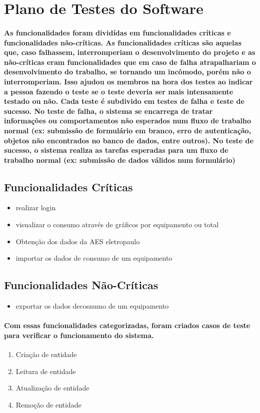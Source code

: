 \section{Plano de Testes do Software}
\label{Sec:6-software}
\paragraph{%
As funcionalidades foram dividídas em funcionalidades críticas e funcionalidades não-críticas. As funcionalidades críticas são aquelas que, caso falhassem, interromperiam o desenvolvimento do projeto e as não-críticas eram funcionalidades que em caso de falha atrapalhariam o desenvolvimento do trabalho, se tornando um incômodo, porém não o interromperiam. Isso ajudou os membros na hora dos testes ao indicar a pessoa fazendo o teste se o teste deveria ser mais intensamente testado ou não. Cada teste é subdivido em testes de falha e teste de sucesso. No teste de falha, o sistema se encarrega de tratar informações ou comportamentos não esperados num fluxo de trabalho normal (ex: submissão de formulário em branco, erro de autenticação, objetos não encontrados no banco de dados, entre outros). No teste de sucesso, o sistema realiza as tarefas esperadas para um fluxo de trabalho normal (ex: submissão de dados válidos num formulário)
}
\subsection{Funcionalidades Críticas}
\begin{itemize}
\item{realizar login}
\item{visualizar o consumo através de gráficos por equipamento ou total}
\item{Obtenção dos dados da AES eletropaulo}
\item{importar os dados de consumo de um equipamento}
\end{itemize}
%
\subsection{Funcionalidades Não-Críticas}
\begin{itemize}
\item{exportar os dados decosnumo de um equipamento}
\end{itemize}
%
\paragraph{%
Com essas funcionalidades categorizadas, foram criados casos de teste para verificar o funcionamento do sistema.
}
%
\begin{enumerate}
\item{
  Criação de entidade
}
\item{Leitura de entidade}
\item{Atualização de entidade}
\item{Remoção de entidade}

\end{enumerate}